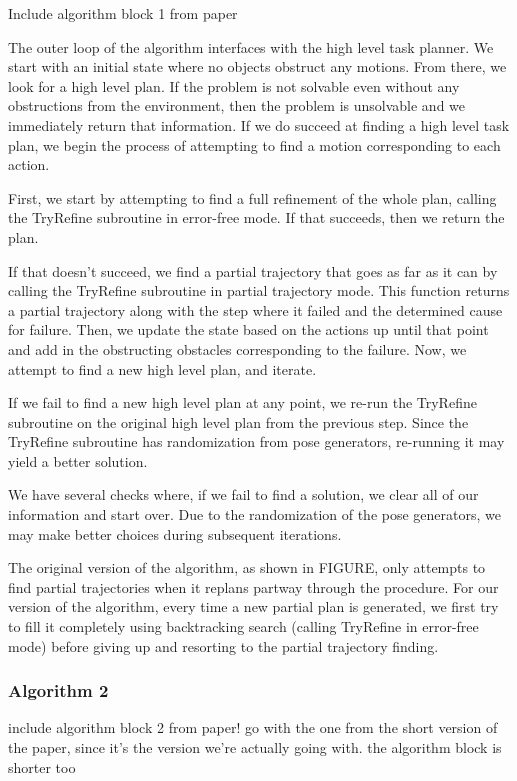 \documentclass[12pt]{article}
\begin{document}
Include algorithm block 1 from paper

The outer loop of the algorithm interfaces with the high level task planner.  
We start with an initial state where no objects obstruct any motions.  
From there, we look for a high level plan.  
If the problem is not solvable even without any obstructions from the environment, then the problem is unsolvable and we immediately return that information.  
If we do succeed at finding a high level task plan, we begin the process of attempting to find a motion corresponding to each action.

First, we start by attempting to find a full refinement of the whole plan, calling the TryRefine subroutine in error-free mode.  
If that succeeds, then we return the plan.  

If that doesn't succeed, we find a partial trajectory that goes as far as it can by calling the TryRefine subroutine in partial trajectory mode.  
This function returns a partial trajectory along with the step where it failed and the determined cause for failure.  
Then, we update the state based on the actions up until that point and add in the obstructing obstacles corresponding to the failure.  
Now, we attempt to find a new high level plan, and iterate.  

If we fail to find a new high level plan at any point, we re-run the TryRefine subroutine on the original high level plan from the previous step.  
Since the TryRefine subroutine has randomization from pose generators, re-running it may yield a better solution. 

We have several checks where, if we fail to find a solution, we clear all of our information and start over.  Due to the randomization of the pose generators, we may make better choices during subsequent iterations.  

The original version of the algorithm, as shown in FIGURE, only attempts to find partial trajectories when it replans partway through the procedure.  For our version of the algorithm, every time a new partial plan is generated, we first try to fill it completely using backtracking search (calling TryRefine in error-free mode) before giving up and resorting to the partial trajectory finding.  

\subsubsection{Algorithm 2}

include algorithm block 2 from paper!  go with the one from the short version of the paper, since it's the version we're actually going with.  the algorithm block is shorter too
\end{document}
